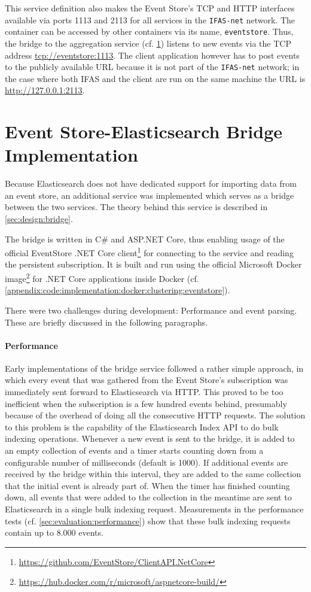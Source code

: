 This service definition also makes the Event Store's \ac{TCP} and \ac{HTTP} interfaces available via ports 1113 and 2113 for all services in the \texttt{IFAS-net} network.
The container can be accessed by other containers via its name, \texttt{eventstore}.
Thus, the bridge to the aggregation service (cf. \cref{sec:implementation:bridge}) listens to new events via the \ac{TCP} address \url{tcp://eventstore:1113}.
The client application however has to post events to the publicly available URL because it is not part of the \texttt{IFAS-net} network; in the case where both \ac{IFAS} and the client are run on the same machine the URL is \url{http://127.0.0.1:2113}.

\section{Event Store-Elasticsearch Bridge Implementation}
\label{sec:implementation:bridge}

Because Elasticsearch does not have dedicated support for importing data from an event store, an additional service was implemented which serves as a bridge between the two services.
The theory behind this service is described in \cref{sec:design:bridge}.

The bridge is written in C\# and ASP.NET Core, thus enabling usage of the official EventStore .NET Core client\footnote{\url{https://github.com/EventStore/ClientAPI.NetCore}} for connecting to the service and reading the persistent subscription.
It is built and run using the official Microsoft Docker image\footnote{\url{https://hub.docker.com/r/microsoft/aspnetcore-build/}} for .NET Core applications inside Docker (cf. \cref{appendix:code:implementation:docker:clustering:eventstore}).

There were two challenges during development: Performance and event parsing.
These are briefly discussed in the following paragraphs.

\paragraph{Performance}
Early implementations of the bridge service followed a rather simple approach, in which every event that was gathered from the Event Store's subscription was immediately sent forward to Elasticsearch via \ac{HTTP}.
This proved to be too inefficient when the subscription is a few hundred events behind, presumably because of the overhead of doing all the consecutive \ac{HTTP} requests.
The solution to this problem is the capability of the Elasticsearch Index \ac{API} to do bulk indexing operations.
Whenever a new event is sent to the bridge, it is added to an empty collection of events and a timer starts counting down from a configurable number of milliseconds (default is 1000).
If additional events are received by the bridge within this interval, they are added to the same collection that the initial event is already part of.
When the timer has finished counting down, all events that were added to the collection in the meantime are sent to Elasticsearch in a single bulk indexing request.
Measurements in the performance tests (cf. \cref{sec:evaluation:performance}) show that these bulk indexing requests contain up to 8.000 events.

